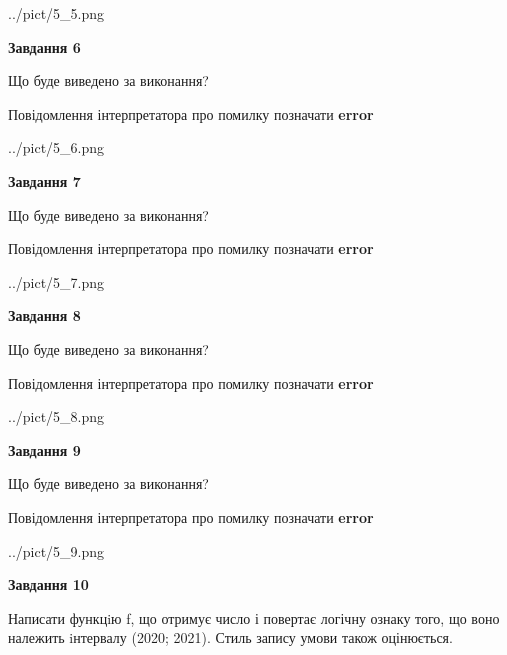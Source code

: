 \documentclass[12pt, ukrainian]{article}
\begin{document}
{\begin {large}
\begin{center}
	{../pict/5_5.png}
\end{center}
\newpage

{\begin {center}\textbf{Завдання 6}\end {center}}\par
Що буде виведено за виконання? \par
Повідомлення інтерпретатора про помилку позначати \textbf{error}

\begin{center}
	{../pict/5_6.png}
\end{center}
\newpage

{\begin {center}\textbf{Завдання 7}\end {center}}\par
Що буде виведено за виконання? \par
Повідомлення інтерпретатора про помилку позначати \textbf{error}

\begin{center}
	{../pict/5_7.png}
\end{center}
\newpage

{\begin {center}\textbf{Завдання 8}\end {center}}\par
Що буде виведено за виконання? \par
Повідомлення інтерпретатора про помилку позначати \textbf{error}

\begin{center}
	{../pict/5_8.png}
\end{center}
\newpage

{\begin {center}\textbf{Завдання 9}\end {center}}\par
Що буде виведено за виконання? \par
Повідомлення інтерпретатора про помилку позначати \textbf{error}

\begin{center}
	{../pict/5_9.png}
\end{center}
\newpage

{\begin {center}\textbf{Завдання 10}\end {center}}\par

Написати функцiю f, що отримує число і повертає логічну ознаку того, що воно належить iнтервалу (2020; 2021). Стиль запису умови також оцінюється.\par
\newpage

\end {large}}
\end{document}
